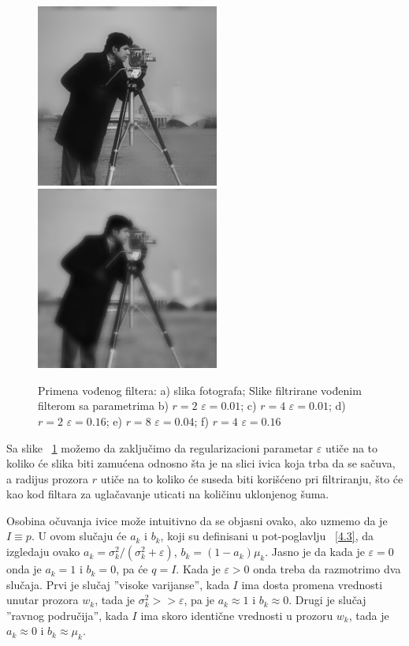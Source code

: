 \documentclass[a4paper,12pt,titlepage]{article}
\begin{document}
\begin{figure}[ht!]
\includegraphics[width=60mm]{img/imgGF8_04.png}
\includegraphics[width=60mm]{img/imgGF4_16.png}
\caption{Primena vođenog filtera: a) slika fotografa; Slike filtrirane vođenim filterom sa parametrima b) $r = 2$ $\varepsilon = 0.01$; c) $r = 4$ $\varepsilon = 0.01$; d) $r = 2$ $\varepsilon = 0.16$; e) $r = 8$ $\varepsilon = 0.04$; f) $r = 4$ $\varepsilon = 0.16$}
\label{gfilter}
\end{figure}

Sa slike ~\ref{gfilter} možemo da zaključimo da regularizacioni parametar $\varepsilon$ utiče na to koliko će slika biti zamućena odnosno šta je na slici ivica koja trba da se sačuva, a radijus prozora $r$ utiče na to koliko će suseda biti korišćeno pri filtriranju, što će kao kod filtara za uglačavanje uticati na količinu uklonjenog šuma. 

Osobina očuvanja ivice može intuitivno da se objasni ovako, ako uzmemo da je $I \equiv p$. U ovom slučaju će $a_k$ i $b_k$, koji su definisani u pot-poglavlju ~\ref{4.3}, da izgledaju ovako $a_k = \sigma_k^2 / (\sigma_k^2 + \varepsilon)$, $b_k = (1 - a_k)\mu_k$. Jasno je da kada je $\varepsilon = 0$ onda je $a_k = 1$ i $b_k = 0$, pa će $q = I$. Kada je $\varepsilon > 0$ onda treba da razmotrimo dva slučaja. Prvi je slučaj ''visoke varijanse'', kada $I$ ima dosta promena vrednosti unutar prozora $w_k$, tada je $\sigma_k^2 >> \varepsilon$, pa je $a_k \approx 1$ i $b_k \approx 0$. Drugi je slučaj ''ravnog područija'', kada $I$ ima skoro identične vrednosti u prozoru $w_k$, tada je $a_k \approx 0$ i $b_k \approx \mu_k$. 
\end{document}
